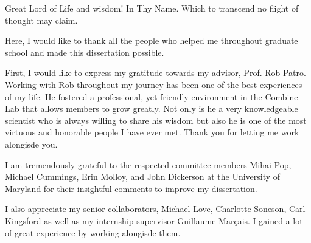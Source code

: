 




Great Lord of Life and wisdom! In Thy Name.
Which to transcend no flight of thought may claim.

Here, I would like to thank all the people who helped me throughout graduate school and made this dissertation possible.

First, I would like to express my gratitude towards my advisor, Prof. Rob Patro. Working with Rob throughout my journey has been one of the best experiences of my life. He fostered a professional, yet friendly environment in the Combine-Lab that allows members to grow greatly. Not only is he a very knowledgeable scientist who is always willing to share his wisdom but also he is one of the most virtuous and honorable people I have ever met. Thank you for letting me work alongisde you.

I am tremendously grateful to the respected committee members Mihai Pop, Michael Cummings, Erin Molloy, and John Dickerson at the University of Maryland for their insightful comments to improve my dissertation.

I also appreciate my senior collaborators, Michael Love, Charlotte Soneson, Carl Kingsford as well as my internship supervisor Guillaume Marçais.
I gained a lot of great experience by working alongisde them.

